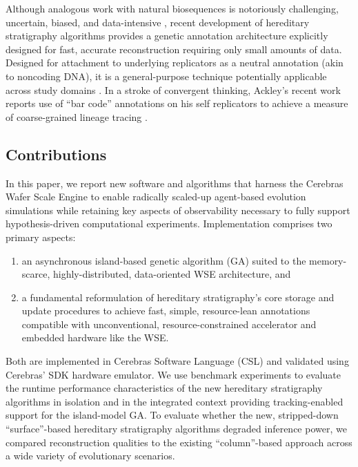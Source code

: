 Although analogous work with natural biosequences is notoriously challenging, uncertain, biased, and data-intensive \citep{neyman1971molecular,lemmon2013high},
recent development of hereditary stratigraphy algorithms provides a genetic annotation architecture explicitly designed for fast, accurate reconstruction requiring only small amounts of data.
Designed for attachment to underlying replicators as a neutral annotation (akin to noncoding DNA), it is a general-purpose technique potentially applicable across study domains \citep{liben2008tracing,cohen1987computer,friggeri2014rumor}.
In a stroke of convergent thinking, Ackley's recent work reports use of ``bar code'' annotations on his self replicators to achieve a measure of coarse-grained lineage tracing \citep{ackley2023robust}.

\subsection{Contributions}

In this paper, we report new software and algorithms that harness the Cerebras Wafer Scale Engine to enable radically scaled-up agent-based evolution simulations while retaining key aspects of observability necessary to fully support hypothesis-driven computational experiments.
Implementation comprises two primary aspects:
\begin{enumerate}
  \item an asynchronous island-based genetic algorithm (GA) suited to the memory-scarce, highly-distributed, data-oriented WSE architecture, and
  \item a fundamental reformulation of hereditary stratigraphy's core storage and update procedures to achieve fast, simple, resource-lean annotations compatible with unconventional, resource-constrained accelerator and embedded hardware like the WSE.
\end{enumerate}

Both are implemented in Cerebras Software Language (CSL) and validated using Cerebras' SDK hardware emulator.
We use benchmark experiments to evaluate the runtime performance characteristics of the new hereditary stratigraphy algorithms in isolation and in the integrated context providing tracking-enabled support for the island-model GA.
To evaluate whether the new, stripped-down ``surface''-based hereditary stratigraphy algorithms degraded inference power, we compared reconstruction qualities to the existing ``column''-based approach across a wide variety of evolutionary scenarios.

